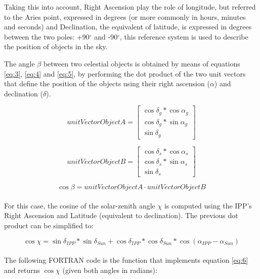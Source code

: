 Taking this into account, Right Ascension play the role of longitude, but referred to the Aries point, expressed in degrees (or more commonly in hours, minutes and seconds) and Declination, the equivalent of latitude, is expressed in degrees between the two poles: +90$^{\circ}$ and -90$^{\circ}$, this reference system is used to describe the position of objects in the sky. \cite{nasareferencesystem}

The angle $\beta$ between two celestial objects is obtained by means of equations \ref{eq:3}, \ref{eq:4} and \ref{eq:5}, by performing the dot product of the two unit vectors that define the position of the objects using their right ascension ($\alpha$) and declination ($\delta$).

\begin{equation} \label{eq:3}
unitVectorObjectA =	
\begin{bmatrix}
\cos\delta_{g} * \cos\alpha_{g} \\ 
\cos\delta_{g} * \sin\alpha_{g} \\
\sin\delta_{g}
\end{bmatrix}
\end{equation}

\begin{equation} \label{eq:4}
unitVectorObjectB =	
\begin{bmatrix}
\cos\delta_{s} * \cos\alpha_{s} \\ 
\cos\delta_{s} * \sin\alpha_{s} \\
\sin\delta_{s}
\end{bmatrix}
\end{equation}

\begin{equation} \label{eq:5}
\cos \beta = unitVectorObjectA \cdot unitVectorObjectB
\end{equation}\\

For this case, the cosine of the solar-zenith angle $\chi$ is computed using the IPP's Right Ascension and Latitude (equivalent to declination). The previous dot product can be simplified to:

\begin{equation} \label{eq:6}
\cos \chi = \sin\delta_{IPP}*\sin\delta_{Sun} + \cos\delta_{IPP}*\cos\delta_{Sun}*\cos(\alpha_{IPP} - \alpha_{Sun})
\end{equation}\\

The following FORTRAN code is the function that implements equation \ref{eq:6} and returns $\cos \chi$ (given both angles in radians):


